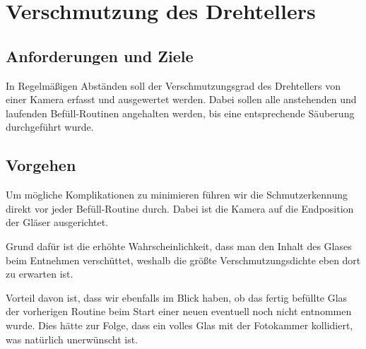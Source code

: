 \chapter{Verschmutzung des Drehtellers}
\section{Anforderungen und Ziele}
In Regelmäßigen Abständen soll der Verschmutzungsgrad des Drehtellers von einer Kamera erfasst und ausgewertet werden. Dabei sollen alle anstehenden und laufenden Befüll-Routinen angehalten werden, bis eine entsprechende Säuberung durchgeführt wurde.

\section{Vorgehen}
Um mögliche Komplikationen zu minimieren führen wir die Schmutzerkennung direkt vor jeder Befüll-Routine durch. Dabei ist die Kamera auf die Endposition der Gläser ausgerichtet.

Grund dafür ist die erhöhte Wahrscheinlichkeit, dass man den Inhalt des Glases beim Entnehmen verschüttet, weshalb die größte Verschmutzungsdichte eben dort zu erwarten ist. 

Vorteil davon ist, dass wir ebenfalls im Blick haben, ob das fertig befüllte Glas der vorherigen Routine beim Start einer neuen eventuell noch nicht entnommen wurde. Dies hätte zur Folge, dass ein volles Glas mit der Fotokammer kollidiert, was natürlich unerwünscht ist.

